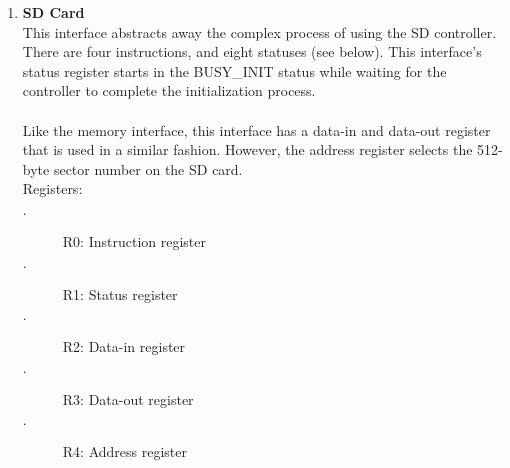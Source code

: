 \documentclass{article}
\begin{document}
\begin{enumerate}
				\item \textbf{SD Card}\\
				This interface abstracts away the complex process of using the SD controller. There are four instructions, and eight statuses (see below). This interface's status register starts in the BUSY\_INIT status while waiting for the controller to complete the initialization process.\\
				\\
				Like the memory interface, this interface has a data-in and data-out register that is used in a similar fashion. However, the address register selects the 512-byte sector number on the SD card.\\
				Registers:
				\begin{description}
					\item[$\cdot$] R0: Instruction register
					\item[$\cdot$] R1: Status register
					\item[$\cdot$] R2: Data-in register
					\item[$\cdot$] R3: Data-out register
					\item[$\cdot$] R4: Address register
				\end{description}
			

\end{enumerate}
\end{document}
